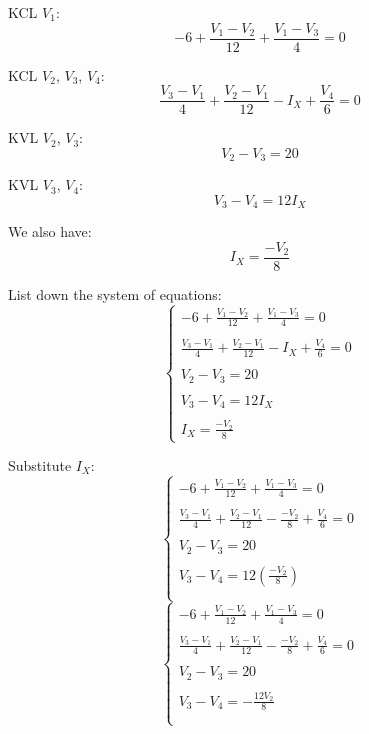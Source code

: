 \documentclass{article}
\begin{document}
			KCL $V_1$:
				\[-6 + \frac{V_1 - V_2}{12} + \frac{V_1 - V_3}{4} = 0\]

			KCL $V_2$, $V_3$, $V_4$:
				\[\frac{V_3 - V_1}{4} + \frac{V_2 - V_1}{12} - I_X + \frac{V_4}{6} = 0\]

			KVL $V_2$, $V_3$:
				\[V_2 - V_3 = 20\]

			KVL $V_3$, $V_4$:
				\[V_3 - V_4 = 12I_X\]

			We also have:
				\[I_X = \frac{-V_2}{8}\]

			List down the system of equations:
				\begin{equation*}\begin{cases}
					\displaystyle -6 + \frac{V_1 - V_2}{12} + \frac{V_1 - V_3}{4} = 0 \\ \\
					\displaystyle \frac{V_3 - V_1}{4} + \frac{V_2 - V_1}{12} - I_X + \frac{V_4}{6} = 0 \\ \\
					\displaystyle V_2 - V_3 = 20 \\ \\
					\displaystyle V_3 - V_4 = 12I_X \\ \\
					\displaystyle I_X = \frac{-V_2}{8}
				\end{cases}\end{equation*}

			Substitute $I_X$:
				\begin{equation*}\begin{cases}
					\displaystyle -6 + \frac{V_1 - V_2}{12} + \frac{V_1 - V_3}{4} = 0 \\ \\
					\displaystyle \frac{V_3 - V_1}{4} + \frac{V_2 - V_1}{12} - \frac{-V_2}{8} + \frac{V_4}{6} = 0 \\ \\
					\displaystyle V_2 - V_3 = 20 \\ \\
					\displaystyle V_3 - V_4 = 12\left(\frac{-V_2}{8}\right) \\ \\
				\end{cases}\end{equation*}
				\begin{equation*}\begin{cases}
					\displaystyle -6 + \frac{V_1 - V_2}{12} + \frac{V_1 - V_3}{4} = 0 \\ \\
					\displaystyle \frac{V_3 - V_1}{4} + \frac{V_2 - V_1}{12} - \frac{-V_2}{8} + \frac{V_4}{6} = 0 \\ \\
					\displaystyle V_2 - V_3 = 20 \\ \\
					\displaystyle V_3 - V_4 = -\frac{12V_2}{8} \\ \\
				\end{cases}\end{equation*}
\end{document}
